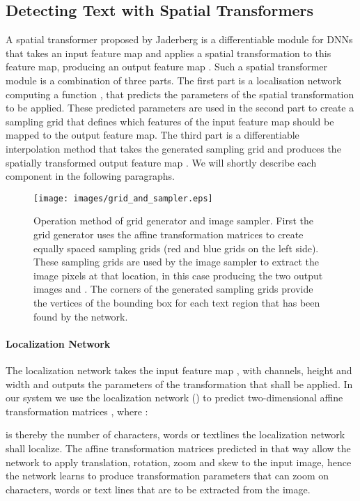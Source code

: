 \documentclass[10pt,twocolumn,letterpaper]{article}
\begin{document}
\subsection{Detecting Text with Spatial Transformers}
\label{subsec:ps_spatial_transformer_networks}

A spatial transformer proposed by Jaderberg \etal \cite{Jaderberg2015Spatial} is a differentiable module for \acp{DNN} that takes an input feature map  and applies a spatial transformation to this feature map, producing an output feature map .
Such a spatial transformer module is a combination of three parts.
The first part is a localisation network computing a function , that predicts the parameters  of the spatial transformation to be applied.
These predicted parameters are used in the second part to create a sampling grid that defines which features of the input feature map should be mapped to the output feature map.
The third part is a differentiable interpolation method that takes the generated sampling grid and produces the spatially transformed output feature map .
We will shortly describe each component in the following paragraphs.

\begin{figure}[t]
	\begin{center}
		\texttt{[image: images/grid\_and\_sampler.eps]}
	\end{center}
	\caption{Operation method of grid generator and image sampler. First the grid generator uses the  affine transformation matrices  to create  equally spaced sampling grids (red and blue grids on the left side). These sampling grids are used by the image sampler to extract the image pixels at that location, in this case producing the two output images  and . The corners of the generated sampling grids provide the vertices of the bounding box for each text region that has been found by the network.}
	\label{fig:transformation_params_overview}
\end{figure}

\paragraph{Localization Network}
	The localization network takes the input feature map , with  channels, height  and width  and outputs the parameters  of the transformation that shall be applied.
	In our system we use the localization network () to predict  two-dimensional affine transformation matrices , where :
	

	 is thereby the number of characters, words or textlines the localization network shall localize.
	The affine transformation matrices predicted in that way allow the network to apply translation, rotation, zoom and skew to the input image, hence the network learns to produce transformation parameters that can zoom on characters, words or text lines that are to be extracted from the image.
\end{document}
